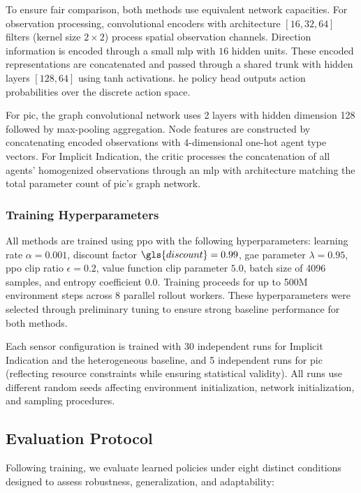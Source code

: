\documentclass[conference]{IEEEtran}
\begin{document}
To ensure fair comparison, both methods use equivalent network capacities. 
For observation processing, convolutional encoders with architecture 
\([16, 32, 64]\) filters (kernel size \(2 \times 2\)) process spatial observation channels. 
Direction information is encoded through a small \gls{mlp} with \(16\) hidden units. 
These encoded representations are concatenated and passed through a shared trunk with 
hidden layers \([128, 64]\) using tanh activations. 
he policy head outputs action probabilities over the discrete action space.

For \gls{pic}, the graph convolutional network uses 2 layers with hidden dimension 128\, 
followed by max-pooling aggregation. Node features are constructed by concatenating
encoded observations with 4-dimensional one-hot agent type vectors. 
For Implicit Indication, the critic processes the concatenation of all agents' 
homogenized observations through an \gls{mlp} with architecture matching the total 
parameter count of \gls{pic}'s graph network.

\subsubsection{Training Hyperparameters}

All methods are trained using \gls{ppo} with the following hyperparameters: 
learning rate \(\alpha = 0.001\), discount factor \(\gls{discount} = 0.99\), 
\gls{gae} parameter \(\lambda = 0.95\), \gls{ppo} clip ratio \(\epsilon = 0.2\), 
value function clip parameter \(5.0\), batch size of 4096 samples, 
and entropy coefficient \(0.0\). 
Training proceeds for up to 500M environment steps across 8 parallel rollout workers. 
These hyperparameters were selected through preliminary tuning to ensure strong 
baseline performance for both methods.

Each sensor configuration is trained with 30 independent runs for Implicit Indication 
and the heterogeneous baseline, and 5 independent runs for \gls{pic}
(reflecting resource constraints while ensuring statistical validity). 
All runs use different random seeds affecting environment initialization, 
network initialization, and sampling procedures.

\subsection{Evaluation Protocol}

Following training, we evaluate learned policies under eight distinct 
conditions designed to assess robustness, generalization, and adaptability:
\end{document}
